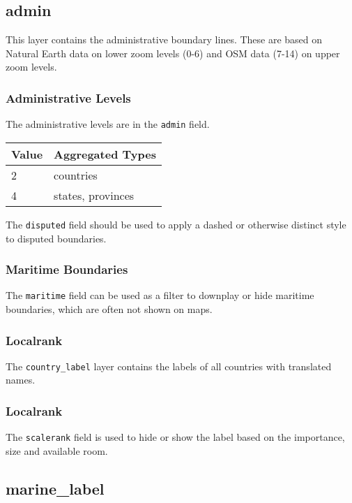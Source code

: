 \subsection*{admin}

This layer contains the administrative boundary lines. These are based
on Natural Earth data on lower zoom levels (0-6) and OSM data (7-14) on
upper zoom levels.

\subsubsection*{Administrative Levels}

The administrative levels are in the \texttt{admin} field. 

\begin{table}[H]
\label{my-label}
\begin{tabular}{l | l}
Value & Aggregated Types  \\ \hline
2     & countries         \\
4     & states, provinces
\end{tabular}
\end{table}

The \texttt{disputed} field should be used to apply a dashed or otherwise
distinct style to disputed boundaries.

\subsubsection*{Maritime Boundaries}

The \texttt{maritime} field can be used as a filter to downplay or hide maritime
boundaries, which are often not shown on maps.

\subsubsection*{Localrank}

The \texttt{country\_label} layer contains the labels of all countries with
translated names.

\subsubsection*{Localrank}

The \texttt{scalerank} field is used to hide or show the label based on the
importance, size and available room.

\subsection*{marine\_label}\label{marine_label}

